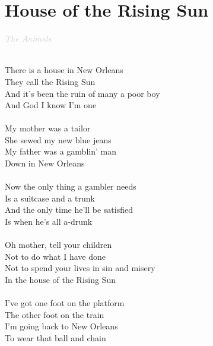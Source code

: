 \documentclass[a5paper, 10pt]{book}
\begin{document}
\section{House of the Rising Sun}\textcolor{lightgray}{\textit{The Animals}}\\~\\
\begin{minipage}[t]{0.8\textwidth}
There is a house in New Orleans\\
They call the Rising Sun\\
And it's been the ruin of many a poor boy\\
And God I know I'm one\\
\\
My mother was a tailor\\
She sewed my new blue jeans\\
My father was a gamblin' man\\
Down in New Orleans\\
\\
Now the only thing a gambler needs\\
Is a suitcase and a trunk\\
And the only time he'll be satisfied\\
Is when he's all a-drunk\\
\\
Oh mother, tell your children\\
Not to do what I have done\\
Not to spend your lives in sin and misery\\
In the house of the Rising Sun\\
\\
I've got one foot on the platform\\
The other foot on the train\\
I'm going back to New Orleans\\
To wear that ball and chain\\

\end{minipage}
\end{document}
